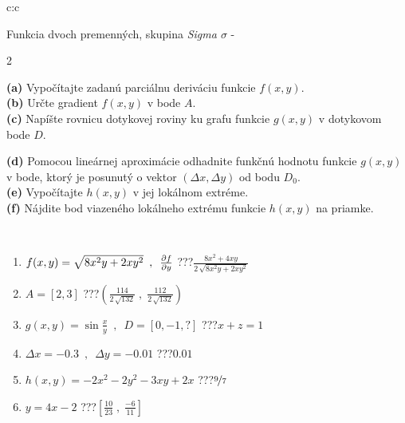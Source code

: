 \documentclass[10pt]{report}
\begin{document}
\begin{tabular}{c:c}
\begin{minipage}[c][104.5mm][t]{0.5\linewidth}
\begin{center}
\vspace{7mm}
{\huge \LARGE Funkcia dvoch premenných, skupina \textit{Sigma $\sigma$} -}\\[5mm]
\begin{minipage}{0.95\linewidth}
\begin{center}
{\small \begin{multicols}{2} \raggedright
\textbf{(a)} Vypočítajte zadanú parciálnu deriváciu funkcie \(f(x,y)\). \\[1mm]
\textbf{(b)} Určte gradient \(f(x,y)\) v bode \(A\). \\[1mm]
\textbf{(c)} Napíšte rovnicu dotykovej roviny ku grafu funkcie \(g(x,y)\) v dotykovom bode \(D\). \par \columnbreak
\textbf{(d)} Pomocou lineárnej aproximácie odhadnite funkčnú hodnotu funkcie \(g(x,y)\) v bode, ktorý je posunutý o vektor \((\Delta x, \Delta y)\) od bodu \(D_0\). \\[1mm]
\textbf{(e)} Vypočítajte \(h(x,y)\) v jej lokálnom extréme. \\[1mm]
\textbf{(f)} Nájdite bod viazeného lokálneho extrému funkcie \(h(x,y)\) na priamke. \\[1mm]
\end{multicols}
}
\end{center}
\end{minipage}
\\[4mm]
\begin{minipage}{0.79\linewidth}
\begin{center}
\begin{varwidth}{\linewidth}
\begin{enumerate}
\normalsizerr
\item $f(x,y) = \sqrt{8x^2y + 2xy^2}\enspace , \enspace \pdv{f}{y}$\quad \dotfill\; ???\;\dotfill \quad $\frac{8x^2+4xy}{2\,\sqrt{8x^2y+2xy^2}}$
\item $A = [2, 3]$\quad \dotfill\; ???\;\dotfill \quad $\left( \frac{114}{2\,\sqrt{132}} \;,\; \frac{112}{2\,\sqrt{132}} \right)$
\item $g(x,y) = \sin\frac{x}{y} \enspace , \enspace D = [0, -1, ?]$\quad \dotfill\; ???\;\dotfill \quad $x+z=1$
\item $\Delta x = {-0.3} \enspace,\enspace \Delta y = {-0.01}$\quad \dotfill\; ???\;\dotfill \quad $0.01$
\item $h(x,y) = -2x^2-2y^2-3xy+2x$\quad \dotfill\; ???\;\dotfill \quad $\nicefrac{9}{7}$
\item $y = 4x-2$\quad \dotfill\; ???\;\dotfill \quad $\left[\frac{10}{23}\;,\;\frac{-6}{11}\right]$

\end{enumerate}
\end{varwidth}
\end{center}
\end{minipage}
\end{center}
\end{minipage}
\end{tabular}
\end{document}

